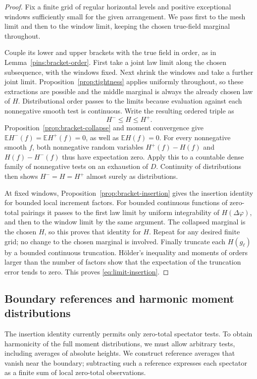 \documentclass[11pt]{article}
\theoremstyle{definition}
\theoremstyle{remark}
\numberwithin{equation}{section}
\begin{document}
\begin{proof}
Fix a finite grid of regular horizontal levels and positive exceptional
windows sufficiently small for the given arrangement.  We pass first
to the mesh limit and then to the window limit, keeping the chosen
true-field marginal throughout.

Couple its lower and upper brackets with the true field in order,
as in Lemma~\ref{pins:bracket-order}.  First take a joint law limit
along the chosen subsequence, with the windows fixed.  Next shrink
the windows and take a further joint limit.  Proposition~\ref{prop:tightness}
applies uniformly throughout, so these extractions are possible and
the middle marginal is always the already chosen law of \(H\).
Distributional order passes to the limits because evaluation against
each nonnegative smooth test is continuous.  Write the resulting
ordered triple as
\[
       H^-\le H\le H^+.
\]
Proposition~\ref{prop:bracket-collapse} and moment convergence give
\(\mathbb E H^-(f)=\mathbb E H^+(f)=0\), as well as \(\mathbb E H(f)=0\).
For every nonnegative smooth \(f\), both nonnegative random variables
\(H^+(f)-H(f)\) and \(H(f)-H^-(f)\) thus have expectation zero.
Apply this to a countable dense family of nonnegative tests on an
exhaustion of \(D\).  Continuity of distributions then shows
\(H^-=H=H^+\) almost surely as distributions.

At fixed windows, Proposition~\ref{prop:bracket-insertion} gives the
insertion identity for bounded local increment factors.  For bounded
continuous functions of zero-total pairings it passes to the first
law limit by uniform integrability of \(H(\Delta\varphi)\), and then
to the window limit by the same argument.  The collapsed marginal is
the chosen \(H\), so this proves that identity for \(H\).
Repeat for any desired finite grid; no change to the chosen marginal
is involved.  Finally truncate each \(H(g_\ell)\) by a bounded
continuous truncation.  H\"older's inequality and moments of orders
larger than the number of factors show that the expectation of the
truncation error tends to zero.  This proves
\eqref{eq:limit-insertion}.
\end{proof}

\subsection{Boundary references and harmonic moment distributions}

The insertion identity currently permits only zero-total spectator
tests.  To obtain harmonicity of the full moment distributions, we
must allow arbitrary tests, including averages of absolute heights.
We construct reference averages that vanish near the boundary;
subtracting such a reference expresses each spectator as a finite
sum of local zero-total observations.
\end{document}
